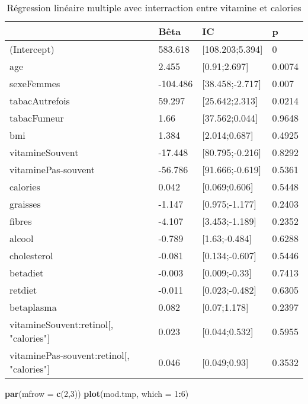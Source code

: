 \documentclass[]{article}
\newenvironment{Shaded}{\begin{snugshade}}{\end{snugshade}}
\newcommand{\KeywordTok}[1]{\textcolor[rgb]{0.13,0.29,0.53}{\textbf{#1}}}
\newcommand{\DataTypeTok}[1]{\textcolor[rgb]{0.13,0.29,0.53}{#1}}
\newcommand{\DecValTok}[1]{\textcolor[rgb]{0.00,0.00,0.81}{#1}}
\newcommand{\OperatorTok}[1]{\textcolor[rgb]{0.81,0.36,0.00}{\textbf{#1}}}
\newcommand{\NormalTok}[1]{#1}
\begin{document}
\begin{table}

\caption{\label{tab:unnamed-chunk-73}Régression linéaire multiple avec interraction entre vitamine et calories}
\centering
\begin{tabular}[t]{l|l|l|l}
\hline
  & Bêta & IC & p\\
\hline
\rowcolor[HTML]{BBD2E1}  (Intercept) & 583.618 & [108.203;5.394] & 0\\
\hline
age & 2.455 & [0.91;2.697] & 0.0074\\
\hline
\rowcolor[HTML]{BBD2E1}  sexeFemmes & -104.486 & [38.458;-2.717] & 0.007\\
\hline
tabacAutrefois & 59.297 & [25.642;2.313] & 0.0214\\
\hline
\rowcolor[HTML]{BBD2E1}  tabacFumeur & 1.66 & [37.562;0.044] & 0.9648\\
\hline
bmi & 1.384 & [2.014;0.687] & 0.4925\\
\hline
\rowcolor[HTML]{BBD2E1}  vitamineSouvent & -17.448 & [80.795;-0.216] & 0.8292\\
\hline
vitaminePas-souvent & -56.786 & [91.666;-0.619] & 0.5361\\
\hline
\rowcolor[HTML]{BBD2E1}  calories & 0.042 & [0.069;0.606] & 0.5448\\
\hline
graisses & -1.147 & [0.975;-1.177] & 0.2403\\
\hline
\rowcolor[HTML]{BBD2E1}  fibres & -4.107 & [3.453;-1.189] & 0.2352\\
\hline
alcool & -0.789 & [1.63;-0.484] & 0.6288\\
\hline
\rowcolor[HTML]{BBD2E1}  cholesterol & -0.081 & [0.134;-0.607] & 0.5446\\
\hline
betadiet & -0.003 & [0.009;-0.33] & 0.7413\\
\hline
\rowcolor[HTML]{BBD2E1}  retdiet & -0.011 & [0.023;-0.482] & 0.6305\\
\hline
betaplasma & 0.082 & [0.07;1.178] & 0.2397\\
\hline
\rowcolor[HTML]{BBD2E1}  vitamineSouvent:retinol[, "calories"] & 0.023 & [0.044;0.532] & 0.5955\\
\hline
vitaminePas-souvent:retinol[, "calories"] & 0.046 & [0.049;0.93] & 0.3532\\
\hline
\end{tabular}
\end{table}

\begin{Shaded}
\begin{Highlighting}[]
\KeywordTok{par}\NormalTok{(}\DataTypeTok{mfrow =} \KeywordTok{c}\NormalTok{(}\DecValTok{2}\NormalTok{,}\DecValTok{3}\NormalTok{))}
\KeywordTok{plot}\NormalTok{(mod.tmp, }\DataTypeTok{which =} \DecValTok{1}\OperatorTok{:}\DecValTok{6}\NormalTok{)}
\end{Highlighting}
\end{Shaded}
\end{document}
